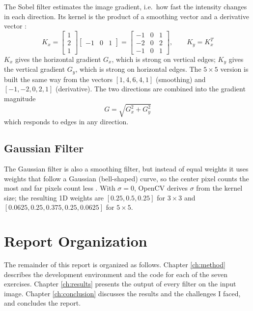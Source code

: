 The Sobel filter estimates the image gradient, i.e.\ how fast the
intensity changes in each direction. Its kernel is the product of a
smoothing vector and a derivative vector \citep{szeliski2022}:
\begin{equation}
  K_x = \begin{bmatrix} 1 \\ 2 \\ 1 \end{bmatrix}
        \begin{bmatrix} -1 & 0 & 1 \end{bmatrix}
      = \begin{bmatrix} -1 & 0 & 1 \\ -2 & 0 & 2 \\ -1 & 0 & 1 \end{bmatrix},
  \qquad K_y = K_x^{T}
  \label{eq:sobel3}
\end{equation}
$K_x$ gives the horizontal gradient $G_x$, which is strong on vertical
edges; $K_y$ gives the vertical gradient $G_y$, which is strong on
horizontal edges. The $5 \times 5$ version is built the same way from
the vectors $[1, 4, 6, 4, 1]$ (smoothing) and $[-1, -2, 0, 2, 1]$
(derivative). The two directions are combined into the gradient
magnitude
\begin{equation}
  G = \sqrt{G_x^2 + G_y^2}
  \label{eq:magnitude}
\end{equation}
which responds to edges in any direction.

\subsection{Gaussian Filter}

The Gaussian filter is also a smoothing filter, but instead of equal
weights it uses weights that follow a Gaussian (bell-shaped) curve, so
the center pixel counts the most and far pixels count less
\citep{gonzalez2018}. With $\sigma = 0$, OpenCV derives $\sigma$ from
the kernel size; the resulting 1D weights are $[0.25, 0.5, 0.25]$ for
$3 \times 3$ and $[0.0625, 0.25, 0.375, 0.25, 0.0625]$ for
$5 \times 5$.


\section{Report Organization}
\label{sec:organization}

The remainder of this report is organized as follows. Chapter
\ref{ch:method} describes the development environment and the code for
each of the seven exercises. Chapter \ref{ch:results} presents the
output of every filter on the input image. Chapter \ref{ch:conclusion}
discusses the results and the challenges I faced, and concludes the
report.
